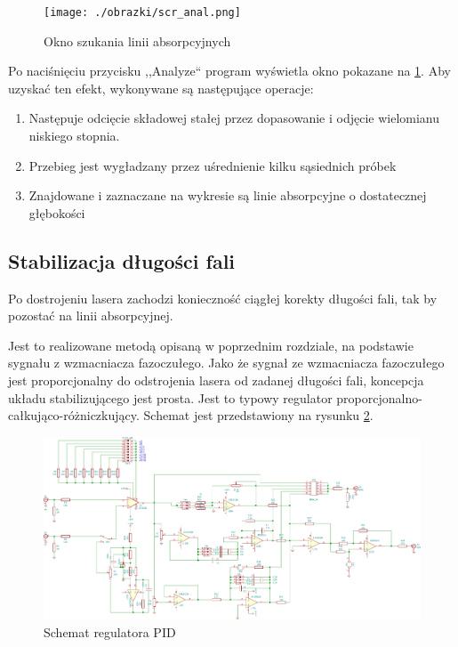 \documentclass[a4paper,10pt]{article}
\begin{document}
\begin{figure}
\begin{center}
 \texttt{[image: ./obrazki/scr\_anal.png]}
\end{center}
\caption{Okno szukania linii absorpcyjnych}
\label{scr-anal}
\end{figure}

Po naciśnięciu przycisku ,,Analyze`` program wyświetla okno pokazane na \ref{scr-anal}.
Aby uzyskać ten efekt, wykonywane są następujące operacje:
\begin{enumerate}
 \item Następuje odcięcie składowej stałej przez dopasowanie i odjęcie wielomianu niskiego stopnia.
 \item Przebieg jest wygładzany przez uśrednienie kilku sąsiednich próbek
 \item Znajdowane i zaznaczane na wykresie są linie absorpcyjne o dostatecznej głębokości
\end{enumerate}





\subsection{Stabilizacja długości fali}

Po dostrojeniu lasera zachodzi konieczność ciągłej korekty długości fali, tak by pozostać na linii absorpcyjnej.

Jest to realizowane metodą opisaną w poprzednim rozdziale, na podstawie sygnału z wzmacniacza fazoczułego. %
Jako że sygnał ze wzmacniacza fazoczułego jest proporcjonalny do odstrojenia lasera od zadanej długości fali, koncepcja układu stabilizującego jest prosta.
Jest to typowy regulator proporcjonalno-całkująco-różniczkujący. Schemat jest przedstawiony na rysunku \ref{sch-pid}.

\begin{figure}
\begin{center}
 \includegraphics[scale=0.4]{./obrazki/pidella.pdf}
\end{center}
\caption{Schemat regulatora PID}
\label{sch-pid}
\end{figure}
\end{document}
